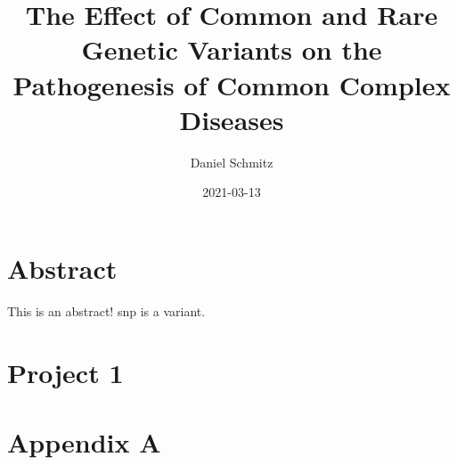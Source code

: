 \documentclass[]{scrbook}
\title{The Effect of Common and Rare Genetic Variants on the Pathogenesis of Common Complex Diseases}
\author{Daniel Schmitz}
\date{2021-03-13}
\begin{document}
\frontmatter

\begin{titlepage}
    \maketitle
\end{titlepage}
\printglossary
\chapter*{Abstract}
    This is an abstract! \Gls{snp} is a \gls{variant}.
\tableofcontents

\mainmatter

\chapter{Project 1}

\backmatter
\chapter*{Appendix A}
\end{document}
